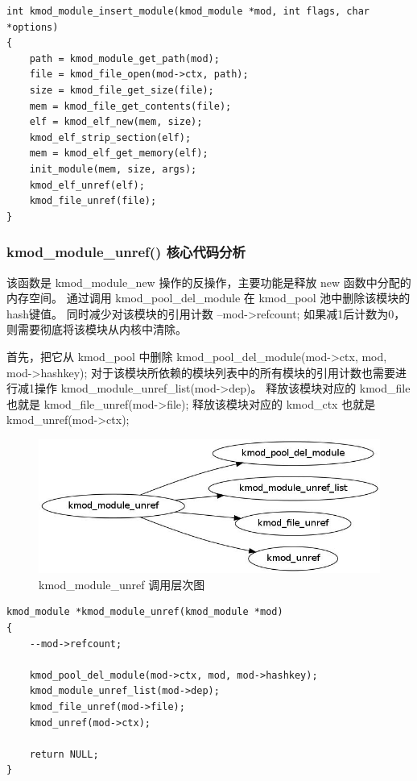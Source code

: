 \documentclass[11pt,a4paper]{article}
\makeatletter
\def\maxwidth{\ifdim\Gin@nat@width>\linewidth\linewidth
\else\Gin@nat@width\fi}
\let\Oldincludegraphics\includegraphics
\renewcommand{\includegraphics}[1]{\Oldincludegraphics[width=\maxwidth]{#1}}
\makeatother
\begin{document}
{\begin{shaded}\begin{verbatim}
int kmod_module_insert_module(kmod_module *mod, int flags, char *options)
{
    path = kmod_module_get_path(mod);
    file = kmod_file_open(mod->ctx, path);
    size = kmod_file_get_size(file);
    mem = kmod_file_get_contents(file);
    elf = kmod_elf_new(mem, size);
    kmod_elf_strip_section(elf);
    mem = kmod_elf_get_memory(elf);
    init_module(mem, size, args);
    kmod_elf_unref(elf);
    kmod_file_unref(file);
}
\end{verbatim}\end{shaded}}
\subsubsection{kmod\_module\_unref() 核心代码分析}

该函数是 kmod\_module\_new 操作的反操作，主要功能是释放 new
函数中分配的内存空间。 通过调用 kmod\_pool\_del\_module 在 kmod\_pool
池中删除该模块的hash键值。 同时减少对该模块的引用计数
--mod-\textgreater{}refcount;
如果减1后计数为0，则需要彻底将该模块从内核中清除。

首先，把它从 kmod\_pool 中删除
kmod\_pool\_del\_module(mod-\textgreater{}ctx, mod,
mod-\textgreater{}hashkey);
对于该模块所依赖的模块列表中的所有模块的引用计数也需要进行减1操作
kmod\_module\_unref\_list(mod-\textgreater{}dep)。 释放该模块对应的
kmod\_file 也就是 kmod\_file\_unref(mod-\textgreater{}file);
释放该模块对应的 kmod\_ctx 也就是 kmod\_unref(mod-\textgreater{}ctx);

\begin{figure}[htbp]
\centering
\includegraphics{./figures/kmod_module_unref.jpg}
\caption{kmod\_module\_unref 调用层次图}
\end{figure}

{\begin{shaded}\begin{verbatim}
kmod_module *kmod_module_unref(kmod_module *mod)
{
    --mod->refcount;

    kmod_pool_del_module(mod->ctx, mod, mod->hashkey);
    kmod_module_unref_list(mod->dep);
    kmod_file_unref(mod->file);
    kmod_unref(mod->ctx);

    return NULL;
}
\end{verbatim}\end{shaded}}
\end{document}
